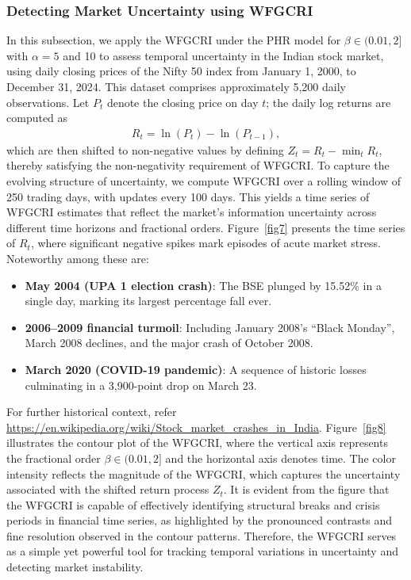 \documentclass[12pt,a4paper]{article}
\numberwithin{equation}{section}
\begin{document}
\subsubsection{Detecting Market Uncertainty using WFGCRI}
In this subsection, we apply the WFGCRI under the PHR model for $\beta \in (0.01,2]$ with $\alpha=5$ and 10 to assess temporal uncertainty in the Indian stock market, using daily closing prices of the Nifty 50 index from January 1, 2000, to December 31, 2024. This dataset comprises approximately 5,200 daily observations. Let \( P_t \) denote the closing price on day \( t \); the daily log returns are computed as 
\begin{align}\label{5.1}
    R_t = \ln(P_t) - \ln(P_{t-1}),
\end{align}
which are then shifted to non-negative values by defining \( Z_t = R_t - \min_t R_t \), thereby satisfying the non-negativity requirement of WFGCRI.
To capture the evolving structure of uncertainty, we compute WFGCRI over a rolling window of 250 trading days, with updates every 100 days. This yields a time series of WFGCRI estimates that reflect the market’s information uncertainty across different time horizons and fractional orders.
Figure~\ref{fig7} presents the time series of \( R_t \), where significant negative spikes mark episodes of acute market stress. Noteworthy among these are: 
\begin{itemize}
	\item \textbf{May 2004 (UPA 1 election crash)}: The BSE plunged by 15.52\% in a single day, marking its largest percentage fall ever.
	\item \textbf{2006–2009 financial turmoil}: Including January 2008’s “Black Monday”, March 2008 declines, and the major crash of October 2008.
	\item \textbf{March 2020 (COVID-19 pandemic)}: A sequence of historic losses culminating in a 3,900-point drop on March 23.
\end{itemize}
For further historical context, refer \url{https://en.wikipedia.org/wiki/Stock_market_crashes_in_India}.
Figure~\ref{fig8} illustrates the contour plot of the WFGCRI, where the vertical axis represents the fractional order $\beta \in (0.01,2]$  and the horizontal axis denotes time. The color intensity reflects the magnitude of the WFGCRI, which captures the  uncertainty associated with the shifted return process $Z_t$. It is evident from the figure that the WFGCRI is capable of effectively identifying structural breaks and crisis periods in financial time series, as highlighted by the pronounced contrasts and fine resolution observed in the contour patterns. Therefore, the WFGCRI serves as a simple yet powerful tool for tracking temporal variations in uncertainty and detecting market instability.
\end{document}
